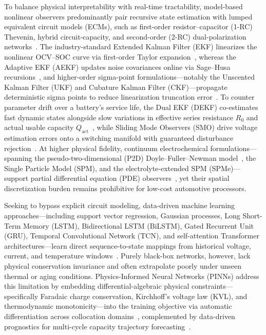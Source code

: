 \documentclass[11pt,a4paper]{article}
\begin{document}
To balance physical interpretability with real-time tractability, model-based nonlinear observers predominantly pair recursive state estimation with lumped equivalent circuit models (ECMs), such as first-order resistor--capacitor (1-RC) Thevenin, hybrid circuit-capacity, and second-order (2-RC) dual-polarization networks~\cite{He2011ecm,Hu2012ecm,Kim2011}. The industry-standard Extended Kalman Filter (EKF) linearizes the nonlinear OCV--SOC curve via first-order Taylor expansion~\cite{Plett2004part3,Santhanagopalan2006jes}, whereas the Adaptive EKF (AEKF) updates noise covariances online via Sage--Husa recursions~\cite{Xiang2022aekf}, and higher-order sigma-point formulations---notably the Unscented Kalman Filter (UKF) and Cubature Kalman Filter (CKF)---propagate deterministic sigma points to reduce linearization truncation error~\cite{Plett2006ukf,He2013ukf,Li2021ackf}. To counter parameter drift over a battery's service life, the Dual EKF (DEKF) co-estimates fast dynamic states alongside slow variations in effective series resistance $R_0$ and actual usable capacity $Q_{\text{act}}$~\cite{Charkhgard2010dekf,Yang2024degradation}, while Sliding Mode Observers (SMO) drive voltage estimation errors onto a switching manifold with guaranteed disturbance rejection~\cite{Chen2016smo,Huangfu2018smo}. At higher physical fidelity, continuum electrochemical formulations---spanning the pseudo-two-dimensional (P2D) Doyle--Fuller--Newman model~\cite{Doyle1993,Torchio2016pybam,Northrop2014p2d}, the Single Particle Model (SPM), and the electrolyte-extended SPM (SPMe)---support partial differential equation (PDE) observers~\cite{DiDomenico2010spm,Moura2017pde,Marquis2019spme}, yet their spatial discretization burden remains prohibitive for low-cost automotive processors.

Seeking to bypass explicit circuit modeling, data-driven machine learning approaches---including support vector regression, Gaussian processes, Long Short-Term Memory (LSTM), Bidirectional LSTM (BiLSTM), Gated Recurrent Unit (GRU), Temporal Convolutional Network (TCN), and self-attention Transformer architectures---learn direct sequence-to-state mappings from historical voltage, current, and temperature windows~\cite{Hansen2005svr,Chemali2018dnn,Liu2020gpr,Song2019bilstm,Jiao2020attn,Liu2021tcn,Vaswani2017attention,Shen2025kf}. Purely black-box networks, however, lack physical conservation invariance and often extrapolate poorly under unseen thermal or aging conditions. Physics-Informed Neural Networks (PINNs) address this limitation by embedding differential-algebraic physical constraints---specifically Faradaic charge conservation, Kirchhoff's voltage law (KVL), and thermodynamic monotonicity---into the training objective via automatic differentiation across collocation domains~\cite{Raissi2019pinn,Brancato2026,Wang2024xjtu}, complemented by data-driven prognostics for multi-cycle capacity trajectory forecasting~\cite{Li2021oneshot}.
\end{document}
